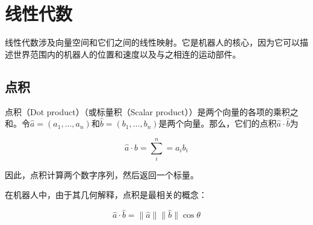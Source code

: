 
\chapter{线性代数}

线性代数涉及向量空间和它们之间的线性映射。它是机器人的核心，因为它可以描述世界范围内的机器人的位置和速度以及与之相连的运动部件。


\section{点积}

点积（Dot product）（或标量积（Scalar product））是两个向量的各项的乘积之和。令$\hat{a}=(a_1,\ldots,a_n)$和$\hat{b}=(b_1,\ldots,b_n)$是两个向量。那么，它们的点积$\hat{a}\cdot\hat{b}$为

\begin{equation}
\hat{a}\cdot\hat{b}=\sum_{i}^n=a_ib_i
\end{equation}



因此，点积计算两个数字序列，然后返回一个标量。

在机器人中，由于其几何解释，点积是最相关的概念：

\begin{equation}
\hat{a}\cdot\hat{b}=\|\hat{a}\|\|\hat{b}\|\cos\theta
\end{equation}

